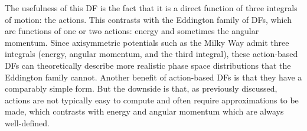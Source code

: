 The usefulness of this DF is the fact that it is a direct function of three integrals of motion: the actions. This contrasts with the Eddington family of DFs, which are functions of one or two actions: energy and sometimes the angular momentum. Since axisymmetric potentials such as the Milky Way admit three integrals (energy, angular momentum, and the third integral), these action-based DFs can theoretically describe more realistic phase space distributions that the Eddington family cannot. Another benefit of action-based DFs is that they have a comparably simple form. But the downside is that, as previously discussed, actions are not typically easy to compute and often require approximations to be made, which contrasts with energy and angular momentum which are always well-defined.